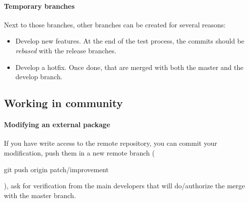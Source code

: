 \paragraph{Temporary branches}
Next to those branches, other branches can be created for several reasons:
\begin{itemize}
\item Develop new features. At the end of the test process, the commits should be \textit{rebased} with the release branches.
\item Develop a hotfix. Once done, that are merged with both the master and the develop branch. 
\end{itemize}





\subsection{Working in community}

\paragraph{Modifying an external package}
If you have write access to the remote repository, you can commit your modification, push them in a new remote branch (\begin{tt}git push origin patch/improvement\end{tt}), ask for verification from the main developers that will do/authorize the merge with the master branch. \\


